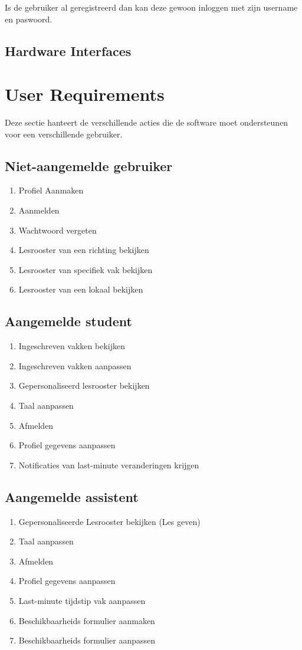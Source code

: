Is de gebruiker al geregistreerd dan kan deze gewoon inloggen met zijn username en paswoord.  

\subsection{Hardware Interfaces}

\section{User Requirements}
Deze sectie hanteert de verschillende acties die de software moet ondersteunen voor een verschillende gebruiker.

\subsection{Niet-aangemelde gebruiker}
\begin{enumerate}
    \item Profiel Aanmaken
    \item Aanmelden
    \item Wachtwoord vergeten
    \item Lesrooster van een richting bekijken
    \item Lesrooster van specifiek vak bekijken
    \item Lesrooster van een lokaal bekijken
\end{enumerate}

\subsection{Aangemelde student}
\begin{enumerate}
    \item Ingeschreven vakken bekijken
    \item Ingeschreven vakken aanpassen
    \item Gepersonaliseerd lesrooster bekijken
    \item Taal aanpassen
    \item Afmelden
    \item Profiel gegevens aanpassen
    \item Notificaties van last-minute veranderingen krijgen
\end{enumerate}

\subsection{Aangemelde assistent}
\begin{enumerate}
    \item Gepersonaliseerde Lesrooster bekijken (Les geven)
    \item Taal aanpassen
    \item Afmelden
    \item Profiel gegevens aanpassen
    \item Last-minute tijdstip vak aanpassen 
    \item Beschikbaarheids formulier aanmaken
    \item Beschikbaarheids formulier aanpassen
\end{enumerate}

